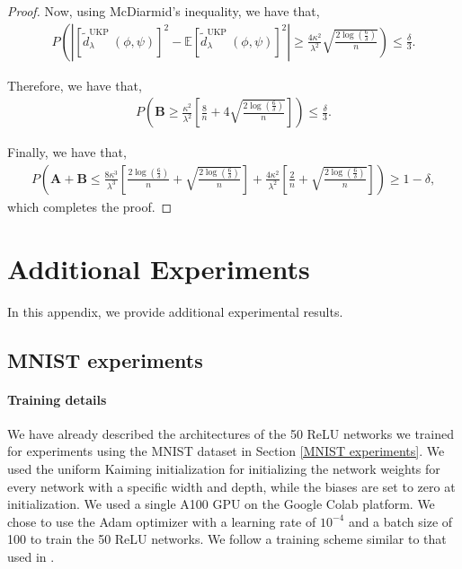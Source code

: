 \documentclass[11pt]{article}
\newcommand{\E}{\mathbb{E}}
\newcommand{\repone}{\phi}
\newcommand{\reptwo}{\psi}
\newcommand{\metricstname}{UKP }
\theoremstyle{plain}
\begin{document}
\begin{proof}
Now, using McDiarmid's inequality, we have that,
\[
\begin{aligned}
    P\left(\left|\left[\tilde{d}_{\lambda}^{\text{\metricstname}}(\repone,\reptwo)\right]^{2} - \E\left[\tilde{d}_{\lambda}^{\text{\metricstname}}(\repone,\reptwo)\right]^{2}\right|\geq \right. \left.\frac{4\kappa^{2}}{\lambda^{2}}\sqrt{\frac{2\log(\frac{6}{\delta})}{n}}\right)\leq \frac{\delta}{3}.
\end{aligned}
\]

Therefore, we have that,
\[
\begin{aligned}
    P\left(\mathbf{B} \geq \frac{\kappa^{2}}{\lambda^{2}}\left[\frac{8}{n} + 4\sqrt{\frac{2\log(\frac{6}{\delta})}{n}}\right]\right) \leq \frac{\delta}{3}.
\end{aligned}
\]

Finally, we have that,
\[
\begin{aligned}
P\left(\mathbf{A}+\mathbf{B} \leq \frac{8\kappa^{3}}{\lambda^{3}}\left[\frac{2\log(\frac{6}{\delta})}{n} + \sqrt{\frac{2\log(\frac{6}{\delta})}{n}}\right] + \frac{4\kappa^{2}}{\lambda^{2}}\left[\frac{2}{n} + \sqrt{\frac{2\log(\frac{6}{\delta})}{n}}\right]\right)
\geq 1-\delta,
\end{aligned}
\]
which completes the proof.
\end{proof}

\newpage

\section{Additional Experiments}
In this appendix, we provide additional experimental results.
\subsection{MNIST experiments}
\label{MNIST Experiments additional}

\paragraph{Training details} We have already described the architectures of the 50 ReLU networks we trained for experiments using the MNIST dataset in Section \ref{MNIST experiments}. We used the uniform Kaiming initialization \cite{he2015delving} for initializing the network weights for every network with a specific width and depth, while the biases are set to zero at initialization. We used a single A100 GPU on the Google Colab platform. We chose to use the Adam optimizer with a learning rate of $10^{-4}$ and a batch size of 100 to train the 50 ReLU networks. We follow a training scheme similar to that used in \citet{GULP}.
\end{document}
